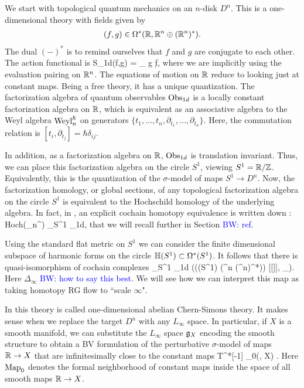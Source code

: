 \documentclass[10pt]{amsart}
\def\brian{\textcolor{blue}{BW: }\textcolor{blue}}
\begin{document}
We start with topological quantum mechanics on an $n$-disk $D^n$. 
This is a one-dimensional theory with fields given by
\begin{align*}
(f,g) \in \Omega^*(\mathbb R, \mathbb R^n \oplus (\mathbb R^n)^*) .
\end{align*}
The dual $(-)^*$ is to remind ourselves that $f$ and $g$ are conjugate to each other. 
The action functional is
\ben
S_{1d}(f,g) = \int_{\RR} g \d f,
\een
where we are implicitly using the evaluation pairing on $\mathbb R^n$. 
The equations of motion on $\mathbb R$ reduce to looking just at constant maps. 
Being a free theory, it has a unique quantization. 
The factorization algebra of quantum observables ${\rm Obs}_{1d}$ is a locally constant factorization algebra on $\mathbb R$, which is equivalent as an associative algebra to the Weyl algebra ${\rm Weyl}^\hbar_n$ on generators $\{t_1,\ldots,t_n, \partial_{t_1}, \ldots, \partial_{t_n}\}$. 
Here, the commutation relation is $[t_i, \partial_{t_j}] = \hbar \delta_{ij}$. 

In addition, as a factorization algebra on $\mathbb R$, ${\rm Obs}_{1d}$ is translation invariant. 
Thus, we can place this factorization algebra on the circle $S^1$, viewing $S^1 = \mathbb R / \mathbb Z$. 
Equivalently, this is the quantization of the $\sigma$-model of maps $S^1 \to D^n$. 
Now, the factorization homology, or global sections, of any topological factorization algebra on the circle $S^1$ is equivalent to the Hochschild homology of the underlying algebra. 
In fact, in \cite{GLL}, an explicit cochain homotopy equivalence is written down
\ben
\Phi : {\rm Hoch}(\Weyl_n^\hbar) \xto{\simeq} \int_{S^1} \Obs_{1d}, 
\een
that we will recall further in Section \brian{ref}. 

Using the standard flat metric on $S^1$ we can consider the finite dimensional subspace of harmonic forms on the circle $\mathbb H(S^1) \subset \Omega^*(S^1)$. 
It follows that there is quasi-isomorphism of cochain complexes 
\ben
\int_{S^1} \Obs_{1d} \xto{\simeq} \left(\sO(\HH(S^1) \tensor (\RR^n \oplus (\RR^n)^*)) [[\hbar]], \hbar \Delta_\infty\right).
\een
Here $\Delta_\infty$ \brian{how to say this best}.
We will see how we can interpret this map as taking homotopy RG flow to ``scale $\infty$". 

In \cite{GradyGwilliamCS1} this theory is called one-dimensional abelian Chern-Simons theory. 
It makes sense when we replace the target $D^n$ with any $L_\infty$ space. 
In particular, if $X$ is a smooth manifold, we can substitute the $L_\infty$ space $\mathfrak g_X$ encoding the smooth structure to obtain a BV formulation of the perturbative $\sigma$-model of maps $\mathbb R \to X$ that are infinitesimally close to the constant maps
\ben
T^*[-1] _0(\RR, X) .
\een
Here ${\rm Map}_0$ denotes the formal neighborhood of constant maps inside the space of all smooth maps $\mathbb R \to X$. 
\end{document}
